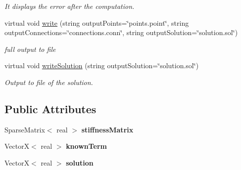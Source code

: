 \begin{DoxyCompactItemize}
\begin{DoxyCompactList}\small\item\em \-It displays the error after the computation. \end{DoxyCompactList}\item 
\hypertarget{class_problem_ad64a7baa630e90b51006b94d76c6943b}{virtual void \hyperlink{class_problem_ad64a7baa630e90b51006b94d76c6943b}{write} (string output\-Points=\char`\"{}points.\-point\char`\"{}, string output\-Connections=\char`\"{}connections.\-conn\char`\"{}, string output\-Solution=\char`\"{}solution.\-sol\char`\"{})}\label{class_problem_ad64a7baa630e90b51006b94d76c6943b}

\begin{DoxyCompactList}\small\item\em full output to file \end{DoxyCompactList}\item 
\hypertarget{class_problem_a15f66edfd2d8672ed4941b65b03b9750}{virtual void \hyperlink{class_problem_a15f66edfd2d8672ed4941b65b03b9750}{write\-Solution} (string output\-Solution=\char`\"{}solution.\-sol\char`\"{})}\label{class_problem_a15f66edfd2d8672ed4941b65b03b9750}

\begin{DoxyCompactList}\small\item\em \-Output to file of the solution. \end{DoxyCompactList}\end{DoxyCompactItemize}
\subsection*{\-Public \-Attributes}
\begin{DoxyCompactItemize}
\item 
\hypertarget{class_problem_ace94c8d8501fde93725f41b0ebd34564}{\-Sparse\-Matrix$<$ real $>$ {\bfseries stiffness\-Matrix}}\label{class_problem_ace94c8d8501fde93725f41b0ebd34564}

\item 
\hypertarget{class_problem_a5200b5adea61fcdfc73a1eec0d7074e3}{\-Vector\-X$<$ real $>$ {\bfseries known\-Term}}\label{class_problem_a5200b5adea61fcdfc73a1eec0d7074e3}

\item 
\hypertarget{class_problem_a7ac15171e17c2468d35ff477d61b0a57}{\-Vector\-X$<$ real $>$ {\bfseries solution}}\label{class_problem_a7ac15171e17c2468d35ff477d61b0a57}

\end{DoxyCompactItemize}
